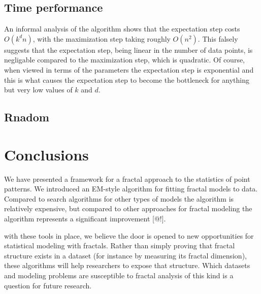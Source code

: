 \documentclass[10pt,a4paper,oneside]{article}
\theoremstyle{definition}
\begin{document}
\subsection{Time performance}

An informal analysis of the algorithm shows that the expectation step costs $O(k^dn)$, with the maximization step taking roughly $O(n^2)$. This falsely suggests that the expectation step, being linear in the number of data points, is negligable compared to the maximization step, which is quadratic. Of course, when viewed in terms of the parameters the expectation step is exponential and this is what causes the expectation step to become the bottleneck for anything but very low values of $k$ and $d$. 

\subsection*{Rnadom}

\section*{Conclusions}

We have presented a framework for a fractal approach to the statistics of point patterns. We introduced an EM-style algorithm for fitting fractal models to data. Compared to search algorithms for other types of models the algorithm is relatively expensive, but compared to other approaches for fractal modeling the algorithm represents a significant improvement [@!]. 

with these tools in place, we believe the door is opened to new opportunities for statistical modeling with fractals. Rather than simply proving that fractal structure exists in a dataset (for instance by measuring its fractal dimension), these algorithms will help researchers to expose that structure. Which datasets and modeling problems are susceptible to fractal analysis of this kind is a question for future research.



\end{document}
